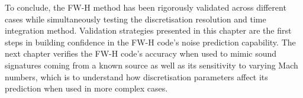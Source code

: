 To conclude, the FW-H method has been rigorously validated across different cases while simultaneously testing the discretisation resolution and time integration method. Validation strategies presented in this chapter are the first steps in building confidence in the FW-H code's noise prediction capability. The next chapter verifies the FW-H code's accuracy when used to mimic sound signatures coming from a known source as well as its sensitivity to varying Mach numbers, which is to understand how discretisation parameters affect its prediction when used in more complex cases.






